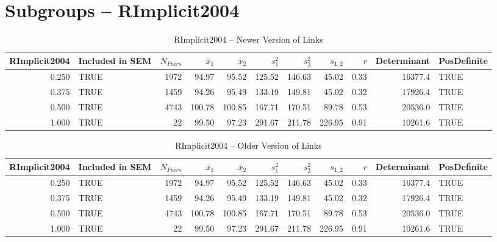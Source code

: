 \documentclass{article}\usepackage[]{graphicx}\usepackage[]{color}
\begin{document}
\section{Subgroups --  RImplicit2004 }%
\begin{table}[ht]
\centering
\begin{tabular}{rlrrrrrrrrl}
  \hline
RImplicit2004 & Included in SEM & $N_{Pairs}$ & $\bar{x}_1$ & $\bar{x}_2$ & $s_1^2$ & $s_2^2$ & $s_{1,2}$ & $r$ & Determinant & PosDefinite \\ 
  \hline
0.250 & TRUE & 1972 & 94.97 & 95.52 & 125.52 & 146.63 & 45.02 & 0.33 & 16377.4 & TRUE \\ 
  0.375 & TRUE & 1459 & 94.26 & 95.49 & 133.19 & 149.81 & 45.02 & 0.32 & 17926.4 & TRUE \\ 
  0.500 & TRUE & 4743 & 100.78 & 100.85 & 167.71 & 170.51 & 89.78 & 0.53 & 20536.0 & TRUE \\ 
  1.000 & TRUE & 22 & 99.50 & 97.23 & 291.67 & 211.78 & 226.95 & 0.91 & 10261.6 & TRUE \\ 
   \hline
\end{tabular}
\caption{RImplicit2004 -- Newer Version of Links} 
\end{table}
\begin{table}[ht]
\centering
\begin{tabular}{rlrrrrrrrrl}
  \hline
RImplicit2004 & Included in SEM & $N_{Pairs}$ & $\bar{x}_1$ & $\bar{x}_2$ & $s_1^2$ & $s_2^2$ & $s_{1,2}$ & $r$ & Determinant & PosDefinite \\ 
  \hline
0.250 & TRUE & 1972 & 94.97 & 95.52 & 125.52 & 146.63 & 45.02 & 0.33 & 16377.4 & TRUE \\ 
  0.375 & TRUE & 1459 & 94.26 & 95.49 & 133.19 & 149.81 & 45.02 & 0.32 & 17926.4 & TRUE \\ 
  0.500 & TRUE & 4743 & 100.78 & 100.85 & 167.71 & 170.51 & 89.78 & 0.53 & 20536.0 & TRUE \\ 
  1.000 & TRUE & 22 & 99.50 & 97.23 & 291.67 & 211.78 & 226.95 & 0.91 & 10261.6 & TRUE \\ 
   \hline
\end{tabular}
\caption{RImplicit2004 -- Older Version of Links} 
\end{table}


\end{document}
